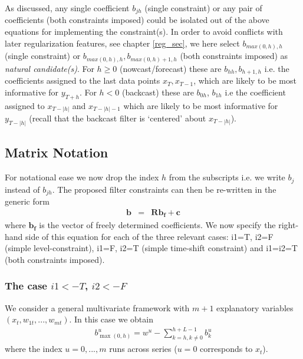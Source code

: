 \documentclass[a4paper]{book}
\begin{document}
As discussed, any single coefficient $b_{jh}$ (single constraint) or any pair of coefficients (both constraints imposed) could be isolated out of the above equations for implementing the constraint(s). In order to avoid conflicts with later regularization features, see chapter \ref{reg_sec}, we here select $b_{max(0,h),h}$ (single constraint) or $b_{max(0,h),h},b_{max(0,h)+1,h}$ (both constraints imposed) as \emph{natural candidate(s)}. For $h\geq 0$ (nowcast/forecast) these are $b_{hh}, b_{h+1,h}$ i.e. the coefficients assigned to the last data points $x_T,x_{T-1}$, which are likely to be most informative for $y_{T+h}$. For $h<0$ (backcast) these are $b_{0h}$, $b_{1h}$ i.e the coefficient assigned to $x_{T-|h|}$ and $x_{T-|h|-1}$ which are likely to be most informative for $y_{T-|h|}$  (recall that the backcast filter is `centered' about $x_{T-|h|}$).








\subsection{Matrix Notation}\label{matrix_notation_constraints}

For notational ease we now drop the index $h$ from the subscripts i.e. we write $b_j$ instead of $b_{jh}$. The proposed filter constraints can then be re-written in the generic form
\begin{eqnarray}\label{cons5s}
\mathbf{b}&=&\mathbf{R b_{f}}+\mathbf{c}
\end{eqnarray}
where $\mathbf{b_f}$ is the vector of freely determined coefficients. We now specify the right-hand side of this equation for each of the three relevant cases: i1=T, i2=F (simple level-constraint), i1=F, i2=T (simple time-shift constraint) and i1=i2=T (both constraints imposed).  


\subsubsection{The case $i1<-T$, $i2<-F$}

We consider a general multivariate framework with $m+1$ explanatory variables $(x_t,w_{1t},...,w_{mt})$. In this case we obtain
\begin{eqnarray*}
b_{\max(0,h)}^u=w^u-\sum_{k=h,k\not=0}^{h+L-1}b_k^u
\end{eqnarray*}
where the index $u=0,...,m$ runs across series ($u=0$ corresponds to $x_t$). \\
\end{document}
